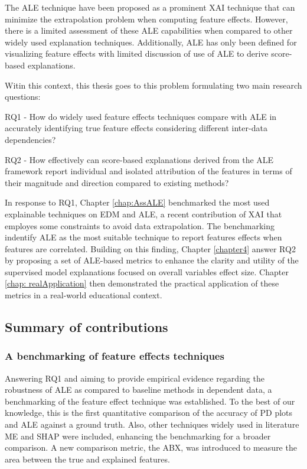 The \gls{ALE} technique have been proposed as a prominent \gls{XAI}  technique that can minimize the extrapolation problem when computing feature effects. However, there is a limited assessment of these \gls{ALE} capabilities when compared to other widely used explanation techniques. Additionally, \gls{ALE} has only been defined for visualizing feature effects with limited discussion of use of \gls{ALE} to derive score-based explanations. 

Witin this context, this thesis goes to this problem formulating two main research questions:


RQ1 - How do widely used feature effects techniques compare with \gls{ALE} in accurately identifying true feature effects considering different inter-data dependencies?

RQ2 - How effectively can score-based explanations derived from the \gls{ALE} framework report individual and isolated attribution of the features in terms of their magnitude and direction compared to existing methods?

In response to RQ1, Chapter \ref{chap:AssALE} benchmarked the most used explainable techniques on \gls{EDM} and \gls{ALE}, a recent contribution of \gls{XAI} that employes some constraints to avoid data extrapolation. The benchmarking indentify \gls{ALE} as the most suitable technique to report features effects when features are correlated. Building on this finding, Chapter \ref{chapter4} answer RQ2 by proposing a set of \gls{ALE}-based metrics to enhance the clarity and utility of the supervised model explanations focused on overall variables effect size. Chapter \ref{chap: realApplication} then demonstrated the practical application of these metrics in a real-world educational context.

\subsection{Summary of contributions}

\subsubsection{A benchmarking of feature effects techniques}

Answering RQ1 and aiming to provide empirical evidence regarding the robustness of \gls{ALE} as compared to baseline methods in dependent data, a benchmarking of the feature effect technique was established. To the best of our knowledge, this is the first quantitative comparison of the accuracy of \gls{PD} plots and \gls{ALE} against a ground truth. Also, other techniques widely used in literature \gls{ME} and \gls{SHAP} were included, enhancing the benchmarking for a broader comparison. A new comparison metric, the \gls{ABX}, was introduced to measure the area between the true and explained features.

